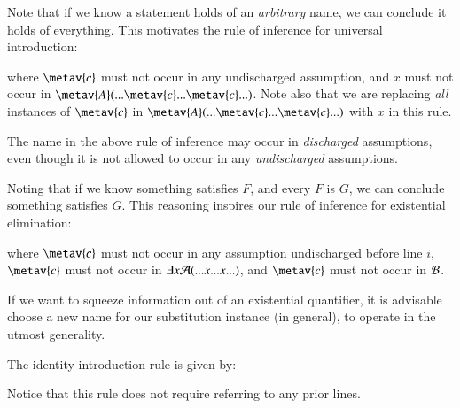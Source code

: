 \documentclass[12pt, a4paper, oneside, openright, titlepage]{book}
\begin{document}
\begin{defn}
    Note that if we know a statement holds of an \emph{arbitrary} name, we can conclude it holds of everything. This motivates the rule of inference for universal introduction: 
    \begin{fitchproof}
         
    \end{fitchproof}
    where $\metav{c}$ must not occur in any undischarged assumption, and $x$ must not occur in $\metav{A}(...\metav{c}...\metav{c}...)$. Note also that we are replacing \emph{all} instances of $\metav{c}$ in $\metav{A}(...\metav{c}...\metav{c}...)$ with $x$ in this rule.
\end{defn}

The name in the above rule of inference may occur in \emph{discharged} assumptions, even though it is not allowed to occur in any \emph{undischarged} assumptions.



\begin{defn}
    Noting that if we know something satisfies $F$, and every $F$ is $G$, we can conclude something satisfies $G$. This reasoning inspires our rule of inference for existential elimination: 
    \begin{fitchproof}
        \open
        \close
         
    \end{fitchproof}
    where $\metav{c}$ must not occur in any assumption undischarged before line $i$, $\metav{c}$ must not occur in $\exists x\mathcal{A}(...x...x...)$, and $\metav{c}$ must not occur in $\mathcal{B}$.
\end{defn}

If we want to squeeze information out of an existential quantifier, it is advisable choose a new name for our substitution instance (in general), to operate in the utmost generality.


\begin{defn}
    The identity introduction rule is given by: \begin{fitchproof}
         
    \end{fitchproof}
    Notice that this rule does not require referring to any prior lines.
\end{defn}
\end{document}
